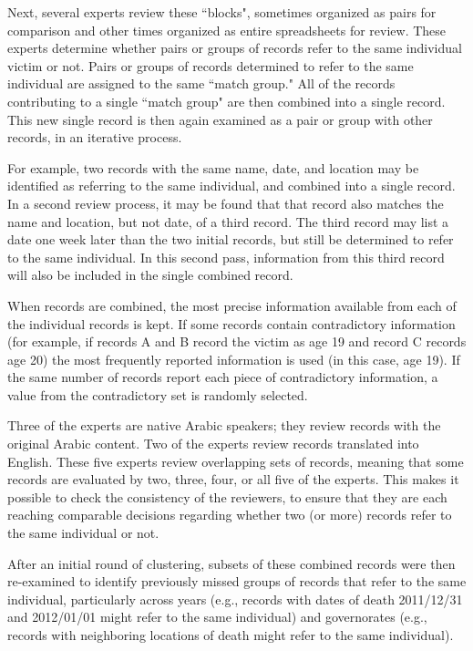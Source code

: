 \documentclass[aoas]{imsart}
\begin{document}
Next, several experts review these ``blocks", sometimes organized as pairs for comparison and other times organized as entire spreadsheets for review.  These experts determine whether pairs or groups of records refer to the same individual victim or not. Pairs or groups of records determined to refer to the same individual are assigned to the same ``match group." All of the records contributing to a single ``match group" are then combined into a single record. This new single record is then again examined as a pair or group with other records, in an iterative process.

For example, two records with the same name, date, and location may be identified as referring to the same individual, and combined into a single record. In a second review process, it may be found that that record also matches the name and location, but not date, of a third record. The third record may list a date one week later than the two initial records, but still be determined to refer to the same individual. In this second pass, information from this third record will also be included in the single combined record.

When records are combined, the most precise information available from each of the individual records is kept. If some records contain contradictory information (for example, if records A and B record the victim as age 19 and record C records age 20) the most frequently reported information is used (in this case, age 19). If the same number of records report each piece of contradictory information, a value from the contradictory set is randomly selected.

Three of the experts are native Arabic speakers; they review records with the original Arabic content. Two of the experts review records translated into English. These five experts review overlapping sets of records, meaning that some records are evaluated by two, three, four, or all five of the experts. This makes it possible to check the consistency of the reviewers, to ensure that they are each reaching comparable decisions regarding whether two (or more) records refer to the same individual or not.

After an initial round of clustering, subsets of these combined records were then re-examined to identify previously missed groups of records that refer to the same individual, particularly across years (e.g., records with dates of death 2011/12/31 and 2012/01/01 might refer to the same individual) and governorates (e.g., records with neighboring locations of death might refer to the same individual).
\end{document}
